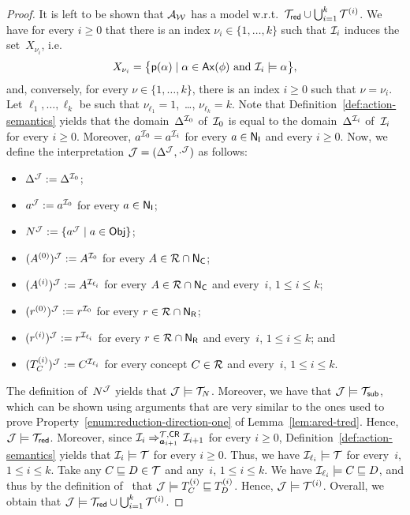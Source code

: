 \begin{proof}
    It is left to be shown that $\mathcal{A}_\mathcal{W}$ has a model w.r.t.\
    $\mathcal{T}_\mathsf{red}\cup\bigcup_{i=1}^k\mathcal{T}^{(i)}$.
    We have for every $i\ge 0$ that there is an index $\nu_i\in\{1,\dots,k\}$
    such that $\mathcal{I}_i$ induces the set~$X_{\nu_i}$, i.e.\
    \[X_{\nu_i}=\bigl\{\psf(\alpha)\mid\alpha\in\Ax(\phi)\ \text{and}\
        \Imc_i\models\alpha\bigr\},\]
    and, conversely, for every $\nu\in\{1,\dots,k\}$, there is an index $i\ge 0$
    such that $\nu=\nu_i$.  Let $\ell_1,\dots,\ell_k$ be such that
    $\nu_{\ell_1}=1$,~\dots, $\nu_{\ell_k}=k$.  Note that
    Definition~\ref{def:action-semantics} yields that the
    domain~$\Delta^{\mathcal{I}_0}$ of~$\mathcal{I}_0$ is equal to the
    domain~$\Delta^{\mathcal{I}_i}$ of~$\mathcal{I}_i$ for every $i\ge 0$.  Moreover,
    $a^{\mathcal{I}_0}=a^{\mathcal{I}_i}$ for every $a\in\mathsf{N_I}$ and every $i\ge 0$.
    Now, we define the interpretation $\mathcal{J}=(\Delta^\mathcal{J},\cdot^\mathcal{J})$ as
    follows:
    \begin{itemize}
        \item $\Delta^\mathcal{J}:=\Delta^{\mathcal{I}_0}$;
        \item $a^\mathcal{J}:=a^{\mathcal{I}_0}$ for every $a\in\mathsf{N_I}$;
        \item $N^\mathcal{J}:=\{a^\mathcal{J}\mid a\in\mathsf{Obj}\}$;
        \item $(A^{(0)})^\mathcal{J}:=A^{\mathcal{I}_0}$ for every $A\in\mathcal{R}\cap\mathsf{N_C}$;
        \item $(A^{(i)})^\mathcal{J}:=A^{\mathcal{I}_{\ell_i}}$ for every $A\in\mathcal{R}\cap\mathsf{N_C}$
            and every~$i$, $1\le i\le k$;
        \item $(r^{(0)})^\mathcal{J}:=r^{\mathcal{I}_0}$ for every $r\in\mathcal{R}\cap\mathsf{N_R}$;
        \item $(r^{(i)})^\mathcal{J}:=r^{\mathcal{I}_{\ell_i}}$ for every $r\in\mathcal{R}\cap\mathsf{N_R}$
            and every~$i$, $1\le i\le k$; and
        \item $(T_C^{(i)})^\mathcal{J}:=C^{\mathcal{I}_{\ell_i}}$ for every concept $C\in\mathcal{R}$
            and every~$i$, $1\le i\le k$.
    \end{itemize}

    The definition of~$N^\mathcal{J}$ yields that $\mathcal{J}\models\mathcal{T}_N$.  Moreover, we have
    that $\mathcal{J}\models\mathcal{T}_\mathsf{sub}$, which can be shown using arguments that are very
    similar to the ones used to prove
    Property~\eqref{enum:reduction-direction-one} of Lemma~\ref{lem:ared-tred}.
    Hence, $\mathcal{J}\models\mathcal{T}_\mathsf{red}$.
    Moreover, since $\mathcal{I}_i\Rightarrow_{\boldsymbol a_{i+1}}^{\mathcal{T},\mathsf{CR}}\mathcal{I}_{i+1}$
    for every $i\ge 0$, Definition~\ref{def:action-semantics} yields that
    $\mathcal{I}_i\models\mathcal{T}$ for every $i\ge 0$.  Thus, we have
    $\mathcal{I}_{\ell_i}\models\mathcal{T}$ for every~$i$, $1\le i\le k$.  Take any
    $C\sqsubseteq D\in\mathcal{T}$ and any~$i$, $1\le i\le k$.  We have
    $\mathcal{I}_{\ell_i}\models C\sqsubseteq D$, and thus by the definition of~\Jmc
    that $\mathcal{J}\models T_C^{(i)}\sqsubseteq T_D^{(i)}$.  Hence,
    $\mathcal{J}\models\mathcal{T}^{(i)}$.
    Overall, we obtain that $\mathcal{J}\models\mathcal{T}_\mathsf{red}\cup\bigcup_{i=1}^k\mathcal{T}^{(i)}$.


\end{proof}
